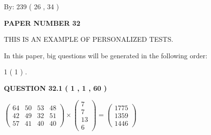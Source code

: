 \documentclass[12pt]{article}
\begin{document}
   
\hspace{1.0in} By: 
         239 (          26 ,           34 )
   
   
   
   
\newpage 
\setcounter{page}{ 
    32001 } 
   
   
   
   
 {\textbf{ \Large{ PAPER NUMBER           32  }}}
   
   
\vspace{0.2in}
   
   
   
   
   
   
 \vspace{0.2in}
{\Huge  THIS IS AN EXAMPLE OF}
{\Huge  PERSONALIZED TESTS. }
   
   
   
\vspace{0.2in}
   
In this paper, big questions will be generated in the following order: 
   
   
             1 (           1 )
 .
  
\vspace{0.2in}
  
{\textbf{\Large{QUESTION
32.1 
 (           1 ,           1 ,          60 )
}}}
  
  
 
 
\noindent{}

 
$\left( \begin{array}{ccccccccccccccc}
          64  & 
          50  & 
          53  & 
          48  \\ 
          42  & 
          49  & 
          32  & 
          51  \\ 
          57  & 
          41  & 
          40  & 
          40
\end{array}\right) \times
\left( \begin{array}{c}
           7  \\ 
           7  \\ 
          13  \\ 
           6
\end{array}\right)  =
\left( \begin{array}{c}
        1775  \\ 
        1359  \\ 
        1446
\end{array}\right)  $
 
\end{document}
